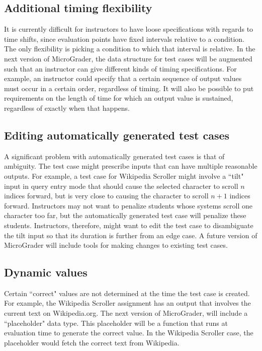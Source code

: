 \documentclass[12pt]{article}
\begin{document}
\subsection{Additional timing flexibility}
It is currently difficult for instructors to have loose specifications with regards to time shifts, since evaluation points have fixed intervals relative to a condition.  The only flexibility is picking a condition to which that interval is relative.  In the next version of MicroGrader, the data structure for test cases will be augmented such that an instructor can give different kinds of timing specifications.  For example, an instructor could specify that a certain sequence of output values must occur in a certain order, regardless of timing.  It will also be possible to put requirements on the length of time for which an output value is sustained, regardless of exactly when that happens.

\subsection{Editing automatically generated test cases}
A significant problem with automatically generated test cases is that of ambiguity.  The test case might prescribe inputs that can have multiple reasonable outputs.  For example, a test case for Wikipedia Scroller might involve a ``tilt" input in query entry mode that should cause the selected character to scroll $n$ indices forward, but is very close to causing the character to scroll $n+1$ indices forward.  Instructors may not want to penalize students whose systems scroll one character too far, but the automatically generated test case will penalize these students.  Instructors, therefore, might want to edit the test case to disambiguate the tilt input so that its duration is further from an edge case.  A future version of MicroGrader will include tools for making changes to existing test cases.

\subsection{Dynamic values}
Certain ``correct" values are not determined at the time the test case is created.  For example, the Wikipedia Scroller assignment has an output that involves the current text on Wikipedia.org.  The next version of MicroGrader, will include a ``placeholder" data type.  This placeholder will be a function that runs at evaluation time to generate the correct value.  In the Wikipedia Scroller case, the placeholder would fetch the correct text from Wikipedia.
\end{document}
